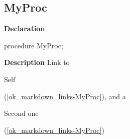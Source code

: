 \documentclass{report}
\newif\ifpdf
\begin{document}
\subsection*{MyProc}
\fi
\label{ok_markdown_links-MyProc}
\begin{list}{}{
\setlength{\itemindent}{0cm}
\setlength{\listparindent}{0cm}
\setlength{\leftmargin}{\evensidemargin}
\addtolength{\leftmargin}{\tmplength}
\settowidth{\labelsep}{X}
\addtolength{\leftmargin}{\labelsep}
\setlength{\labelwidth}{\tmplength}
}
\item[\textbf{Declaration}\hfill]
\ifpdf
\begin{flushleft}
\fi
\begin{ttfamily}
procedure MyProc;\end{ttfamily}

\ifpdf
\end{flushleft}
\fi

\par
\item[\textbf{Description}]
Link to \begin{ttfamily}Self\end{ttfamily}(\ref{ok_markdown_links-MyProc}), and a \begin{ttfamily}Second one\end{ttfamily}(\ref{ok_markdown_links-MyProc})

\end{list}
\end{document}

